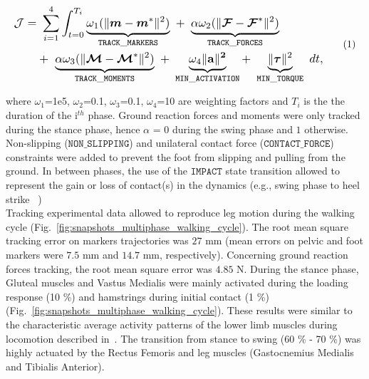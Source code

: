 \[ 
\resizebox{0.9\columnwidth}{!}{$ 
\begin{aligned}
\mathcal{J} = &~\sum_{i=1}^4\int_{t=0}^{T_i}\underbrace{\omega_1(\|\bm{m} - \bm{m}^*\|^{2})}_{\mathtt{TRACK\_MARKERS}}~ 
+ ~ \underbrace{\alpha\omega_2(\|\bm{\mathcal{F}} - \bm{\mathcal{F}}^*\|^{2})}_{\mathtt{TRACK\_FORCES}}\\
&+ ~ \underbrace{\alpha\omega_3(\|\bm{\mathcal{M}} - \bm{\mathcal{M}}^*\|^{2})}_{\mathtt{TRACK\_MOMENTS}}~
+ ~ \underbrace{\omega_4\|\bf{a}\|^2}_{\mathtt{MIN\_ACTIVATION}}
+ ~ \underbrace{\|\boldsymbol{\tau}\|^2}_{\mathtt{MIN\_TORQUE}}~dt, 
\end{aligned}  
$}  
\addtag  
\label{eq:ocp_walk}  
\]

\noindent where $\omega_1$=1e5, $\omega_2$=0.1, $\omega_3$=0.1, $\omega_4$=10 are weighting factors and $T_i$ is the the duration of the  i$^{th}$ phase. 
Ground reaction forces and moments were only tracked during the stance phase, hence $\alpha$ = $0$ during the swing phase and $1$ otherwise. 
Non-slipping ($\mathtt{NON\_SLIPPING}$) and unilateral contact force ($\mathtt{CONTACT\_FORCE}$) constraints were added to prevent the foot from slipping and pulling from the ground. 
In between phases, the use of the $\mathtt{IMPACT}$ state transition allowed to represent the gain or loss of contact(s) in the dynamics (e.g., swing phase to heel strike ~\cite{felis_synthesis_2016}) \\

Tracking experimental data allowed to reproduce leg motion during the walking cycle (Fig.~\ref{fig:snapshots_multiphase_walking_cycle}). 
The root mean square tracking error on markers trajectories was $27$ mm (mean errors on pelvic and foot markers were $7.5$ mm and $14.7$ mm, respectively). 
Concerning ground reaction forces tracking, the root mean square error was $4.85$ N.
During the stance phase, Gluteal muscles and Vastus Medialis were mainly activated during the loading response (10 \%) and hamstrings during initial contact (1 \%) (Fig.~\ref{fig:snapshots_multiphase_walking_cycle}). 
These results were similar to the characteristic average activity patterns of the lower limb muscles during locomotion described in~\cite{winter_biomechanics_1991}. 
The transition from stance to swing (60 \% - 70 \%) was highly actuated by the Rectus Femoris and leg muscles (Gastocnemius Medialis and Tibialis Anterior).
